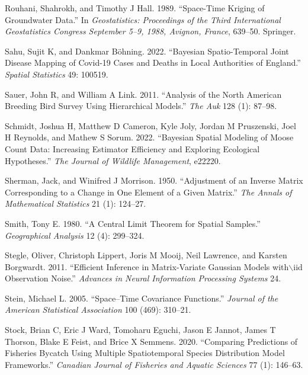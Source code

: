 \documentclass[smallextended]{svjour3}       %
\newlength{\cslhangindent}
\newlength{\cslentryspacingunit} %
\newenvironment{CSLReferences}[2] %
 {%
  \setlength{\parindent}{0pt}
  \ifodd #1
  \let\oldpar\par
  \def\par{\hangindent=\cslhangindent\oldpar}
  \fi
  \setlength{\parskip}{#2\cslentryspacingunit}
 }%
 {}
\begin{document}
\begin{CSLReferences}{1}{0}
\leavevmode{}%
Rouhani, Shahrokh, and Timothy J Hall. 1989. {``Space-Time Kriging of
Groundwater Data.''} In \emph{Geostatistics: Proceedings of the Third
International Geostatistics Congress September 5--9, 1988, Avignon,
France}, 639--50. Springer.

\leavevmode{}%
Sahu, Sujit K, and Dankmar Böhning. 2022. {``Bayesian Spatio-Temporal
Joint Disease Mapping of Covid-19 Cases and Deaths in Local Authorities
of England.''} \emph{Spatial Statistics} 49: 100519.

\leavevmode{}%
Sauer, John R, and William A Link. 2011. {``Analysis of the North
American Breeding Bird Survey Using Hierarchical Models.''} \emph{The
Auk} 128 (1): 87--98.

\leavevmode{}%
Schmidt, Joshua H, Matthew D Cameron, Kyle Joly, Jordan M Pruszenski,
Joel H Reynolds, and Mathew S Sorum. 2022. {``Bayesian Spatial Modeling
of Moose Count Data: Increasing Estimator Efficiency and Exploring
Ecological Hypotheses.''} \emph{The Journal of Wildlife Management},
e22220.

\leavevmode{}%
Sherman, Jack, and Winifred J Morrison. 1950. {``Adjustment of an
Inverse Matrix Corresponding to a Change in One Element of a Given
Matrix.''} \emph{The Annals of Mathematical Statistics} 21 (1): 124--27.

\leavevmode{}%
Smith, Tony E. 1980. {``A Central Limit Theorem for Spatial Samples.''}
\emph{Geographical Analysis} 12 (4): 299--324.

\leavevmode{}%
Stegle, Oliver, Christoph Lippert, Joris M Mooij, Neil Lawrence, and
Karsten Borgwardt. 2011. {``Efficient Inference in Matrix-Variate
Gaussian Models with\(\backslash\)iid Observation Noise.''}
\emph{Advances in Neural Information Processing Systems} 24.

\leavevmode{}%
Stein, Michael L. 2005. {``Space--Time Covariance Functions.''}
\emph{Journal of the American Statistical Association} 100 (469):
310--21.

\leavevmode{}%
Stock, Brian C, Eric J Ward, Tomoharu Eguchi, Jason E Jannot, James T
Thorson, Blake E Feist, and Brice X Semmens. 2020. {``Comparing
Predictions of Fisheries Bycatch Using Multiple Spatiotemporal Species
Distribution Model Frameworks.''} \emph{Canadian Journal of Fisheries
and Aquatic Sciences} 77 (1): 146--63.


\end{CSLReferences}
\end{document}
